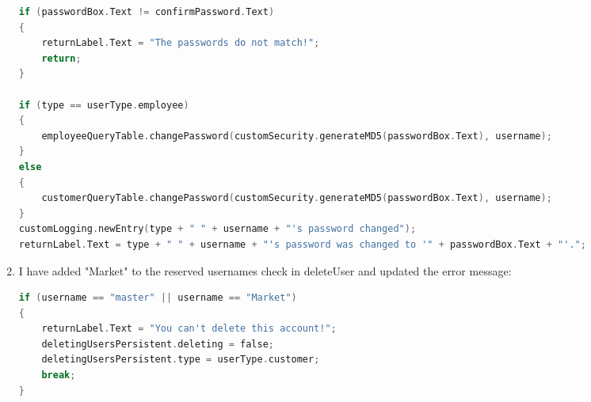 ﻿\documentclass{article}
\begin{document}
\begin{enumerate}
\begin{lstlisting}[language=C]
if (passwordBox.Text != confirmPassword.Text)
{
    returnLabel.Text = "The passwords do not match!";
    return;
}

if (type == userType.employee)
{
    employeeQueryTable.changePassword(customSecurity.generateMD5(passwordBox.Text), username);
}
else
{
    customerQueryTable.changePassword(customSecurity.generateMD5(passwordBox.Text), username);
}
customLogging.newEntry(type + " " + username + "'s password changed");
returnLabel.Text = type + " " + username + "'s password was changed to '" + passwordBox.Text + "'.";
        \end{lstlisting}
        \item I have added "Market" to the reserved usernames check in deleteUser and updated the error message:
        \begin{lstlisting}[language=C]
if (username == "master" || username == "Market")
{
    returnLabel.Text = "You can't delete this account!";
    deletingUsersPersistent.deleting = false;
    deletingUsersPersistent.type = userType.customer;
    break;
}
        \end{lstlisting}
    \end{enumerate}
    \newpage
\end{document}
